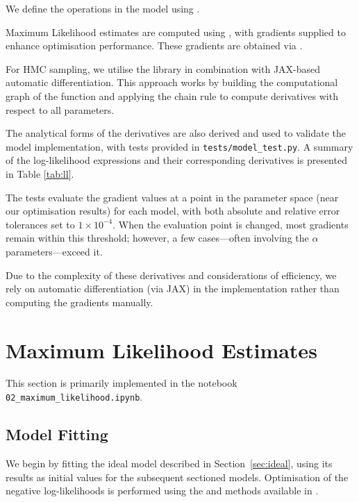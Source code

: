 \documentclass[11pt]{article}
\begin{document}
We define the operations in the model using .

Maximum Likelihood estimates are computed using , with gradients supplied to enhance optimisation performance. These gradients are obtained via .


For HMC sampling, we utilise the  library in combination with JAX-based \cite{jax2018github} automatic differentiation. This approach works by building the computational graph of the function and applying the chain rule to compute derivatives with respect to all parameters.

The analytical forms of the derivatives are also derived and used to validate the model implementation, with tests provided in \texttt{tests/model\_test.py}. A summary of the log-likelihood expressions and their corresponding derivatives is presented in Table \ref{tab:ll}.

The tests evaluate the gradient values at a point in the parameter space (near our optimisation results) for each model, with both absolute and relative error tolerances set to $1\times 10^{-4}$. When the evaluation point is changed, most gradients remain within this threshold; however, a few cases—often involving the $\alpha$ parameters—exceed it.

Due to the complexity of these derivatives and considerations of efficiency, we rely on automatic differentiation (via JAX) in the implementation rather than computing the gradients manually.







\section{Maximum Likelihood Estimates}

This section is primarily implemented in the notebook \texttt{02\_maximum\_likelihood.ipynb}.

\subsection{Model Fitting}
We begin by fitting the ideal model described in Section~\ref{sec:ideal}, using its results as initial values for the subsequent sectioned models. Optimisation of the negative log-likelihoods is performed using the  and  methods available in .
\end{document}
